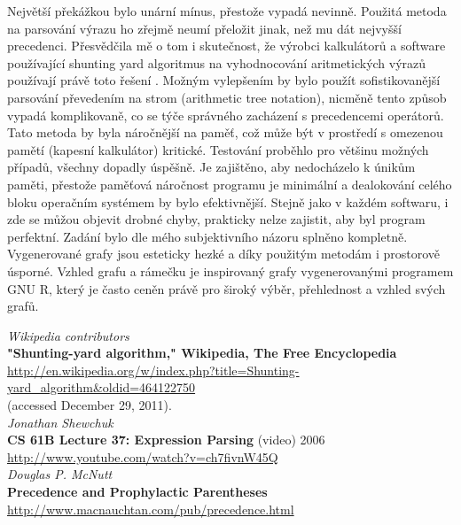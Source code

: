 \documentclass[11pt]{article}
\begin{document}
Největší překážkou bylo unární mínus, přestože vypadá nevinně.  Použitá metoda
na parsování výrazu ho zřejmě neumí přeložit jinak, než mu dát nejvyšší
precedenci. Přesvědčila mě o tom i skutečnost, že výrobci kalkulátorů a
software používající shunting yard algoritmus na vyhodnocování aritmetických
výrazů používají právě toto řešení \cite{minus}. Možným vylepšením by bylo
použít sofistikovanější parsování převedením na strom (arithmetic tree
notation), nicměně tento způsob vypadá komplikovaně, co se týče správného
zacházení s precedencemi operátorů. Tato metoda by byla náročnější na paměť,
což může být v prostředí s omezenou pamětí (kapesní kalkulátor) kritické.
Testování proběhlo pro většinu možných případů, všechny dopadly úspěšně. Je
zajištěno, aby nedocházelo k únikům paměti, přestože paměťová náročnost
programu je minimální a dealokování celého bloku operačním systémem by bylo
efektivnější.  Stejně jako v každém softwaru, i zde se můžou objevit drobné
chyby, prakticky nelze zajistit, aby byl program perfektní. Zadání bylo dle
mého subjektivního názoru splněno kompletně. Vygenerované grafy jsou esteticky
hezké a díky použitým metodám i prostorově úsporné. Vzhled grafu a rámečku je
inspirovaný grafy vygenerovanými programem GNU R, který je často ceněn právě
pro široký výběr, přehlednost a vzhled svých grafů. 


\begin{thebibliography}{1}
{\em Wikipedia contributors} \\ 
{\bf "Shunting-yard algorithm," Wikipedia, The Free Encyclopedia} \\
\url{http://en.wikipedia.org/w/index.php?title=Shunting-yard_algorithm&oldid=464122750} \\
(accessed December 29, 2011). \\

{\em Jonathan Shewchuk} \\
{\bf CS 61B Lecture 37: Expression Parsing} (video) 2006 \\
\url{http://www.youtube.com/watch?v=ch7fivnW45Q} \\

{\em Douglas P. McNutt} \\
{\bf Precedence and Prophylactic Parentheses} \\
\url{http://www.macnauchtan.com/pub/precedence.html} \\
\end{thebibliography}
\end{document}
